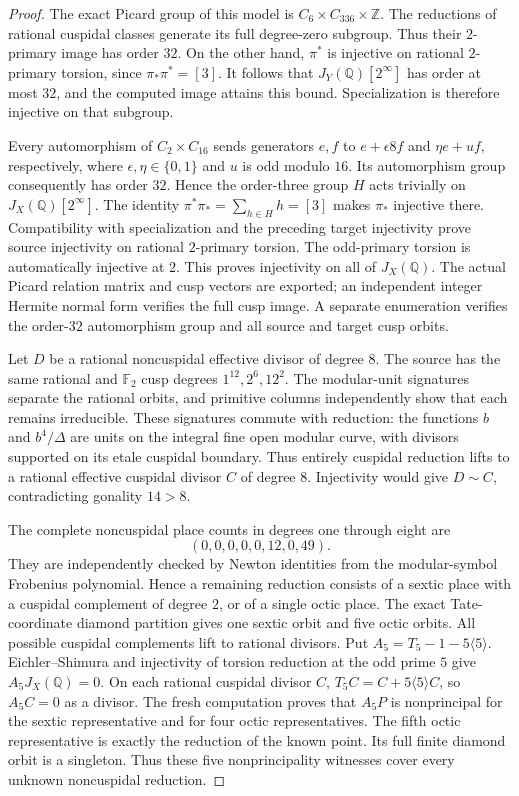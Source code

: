 \begin{proof}
The exact Picard group of this model is
$C_6\times C_{336}\times\mathbb Z$. The reductions of rational
cuspidal classes generate its full degree-zero subgroup. Thus their
$2$-primary image has order $32$. On the other hand, $\pi^*$ is
injective on rational $2$-primary torsion, since
$\pi_*\pi^*=[3]$. It follows that $J_Y(\mathbb Q)[2^\infty]$
has order at most $32$, and the computed image attains this bound.
Specialization is therefore injective on that subgroup.

Every automorphism of $C_2\times C_{16}$ sends generators $e,f$ to
$e+\epsilon8f$ and $\eta e+u f$, respectively, where
$\epsilon,\eta\in\{0,1\}$ and $u$ is odd modulo $16$.
Its automorphism group consequently has order $32$. Hence the
order-three group $H$ acts trivially on $J_X(\mathbb Q)[2^\infty]$.
The identity $\pi^*\pi_* = \sum_{h\in H}h=[3]$ makes $\pi_*$
injective there. Compatibility with specialization and the preceding
target injectivity prove source injectivity on rational $2$-primary
torsion. The odd-primary torsion is automatically injective at $2$.
This proves injectivity on all of $J_X(\mathbb Q)$.
The actual Picard relation matrix and cusp vectors are exported;
an independent integer Hermite normal form verifies the full cusp
image. A separate enumeration verifies the order-$32$ automorphism
group and all source and target cusp orbits.

Let $D$ be a rational noncuspidal effective divisor of degree $8$.
The source has the same rational and $\mathbb F_2$ cusp degrees
$1^{12},2^6,12^2$. The modular-unit signatures separate the rational
orbits, and primitive columns independently show that each remains
irreducible. These signatures commute with reduction: the functions
$b$ and $b^4/\Delta$ are units on the integral fine open modular
curve, with divisors supported on its etale cuspidal boundary.
Thus entirely cuspidal reduction lifts to a rational effective
cuspidal divisor $C$ of degree $8$. Injectivity would give $D\sim C$,
contradicting gonality $14>8$.

The complete noncuspidal place counts in degrees one through eight are
\[
 (0,0,0,0,0,12,0,49).
\]
They are independently checked by Newton identities from the
modular-symbol Frobenius polynomial. Hence a remaining reduction
consists of a sextic place with a cuspidal complement of degree $2$,
or of a single octic place. The exact Tate-coordinate diamond
partition gives one sextic orbit and five octic orbits.
All possible cuspidal complements lift to rational divisors.
Put $A_5=T_5-1-5\langle5\rangle$. Eichler--Shimura and injectivity
of torsion reduction at the odd prime $5$ give
$A_5J_X(\mathbb Q)=0$. On each rational cuspidal divisor $C$,
$T_5C=C+5\langle5\rangle C$, so $A_5C=0$ as a divisor.
The fresh computation proves that $A_5P$ is nonprincipal for the
sextic representative and for four octic representatives. The fifth
octic representative is exactly the reduction of the known point.
Its full finite diamond orbit is a singleton. Thus these five
nonprincipality witnesses cover every unknown noncuspidal reduction.


\end{proof}
